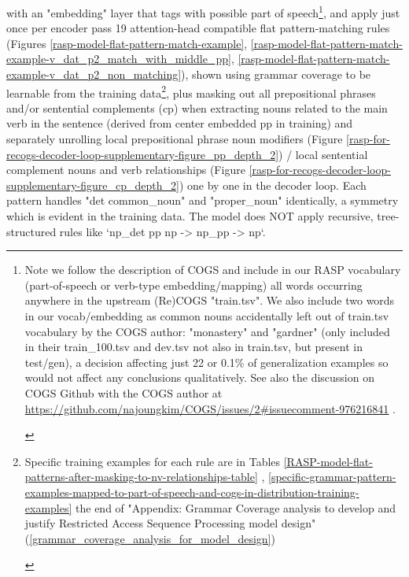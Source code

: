\documentclass[11pt]{article}
\begin{document}
with an "embedding" layer that tags with possible part of speech\footnote{\begin{footnotesize}Note we follow the \cite{klinger2024compositionalprogramgenerationfewshot} description of COGS and include in our RASP vocabulary (part-of-speech or verb-type embedding/mapping) all words occurring anywhere in the upstream (Re)COGS "train.tsv". We also include two words in our vocab/embedding as common nouns accidentally left out of train.tsv vocabulary by the COGS author: "monastery" and "gardner" (only included in their train\_100.tsv and dev.tsv not also in train.tsv, but present in test/gen), a decision affecting just 22 or 0.1\% of generalization examples so would not affect any conclusions qualitatively. See also the discussion on COGS Github with the COGS author at \href{https://github.com/najoungkim/COGS/issues/2\#issuecomment-976216841}{https://github.com/najoungkim/COGS/issues/2\#issuecomment-976216841} .\end{footnotesize}}, and apply just once per encoder pass 19 attention-head compatible flat pattern-matching rules (Figures \ref{rasp-model-flat-pattern-match-example}, \ref{rasp-model-flat-pattern-match-example-v_dat_p2_match_with_middle_pp}, \ref{rasp-model-flat-pattern-match-example-v_dat_p2_non_matching}), shown using grammar coverage \cite{fuzzingbook2023:GrammarCoverageFuzzer} to be learnable from the training data\footnote{\begin{footnotesize}Specific training examples for each rule are in Tables \ref{RASP-model-flat-patterns-after-masking-to-nv-relationships-table} , \ref{specific-grammar-pattern-examples-mapped-to-part-of-speech-and-cogs-in-distribution-training-examples} the end of "Appendix: Grammar Coverage analysis to develop and justify Restricted Access Sequence Processing model design" (\ref{grammar_coverage_analysis_for_model_design})\end{footnotesize}}, plus masking out all prepositional phrases and/or sentential complements (cp) when extracting nouns related to the main verb in the sentence (derived from center embedded pp in training) and separately unrolling local prepositional phrase noun modifiers (Figure \ref{rasp-for-recogs-decoder-loop-supplementary-figure_pp_depth_2}) / local sentential complement nouns and verb relationships (Figure \ref{rasp-for-recogs-decoder-loop-supplementary-figure_cp_depth_2}) one by one in the decoder loop. Each pattern handles "det common\_noun" and "proper\_noun" identically, a symmetry which is evident in the training data. The model does NOT apply recursive, tree-structured rules like `np\_det pp np -> np\_pp -> np`.
\end{document}
